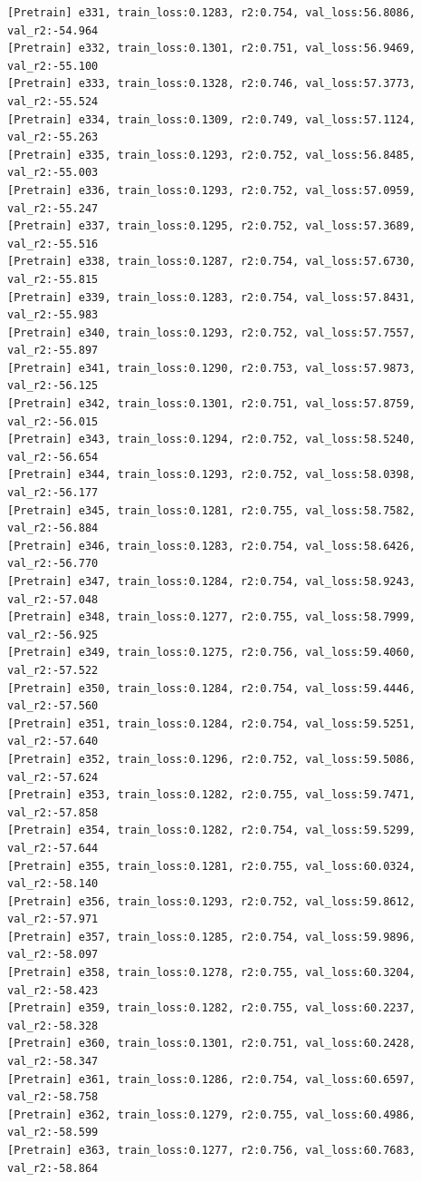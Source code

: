 \documentclass[a4paper, 12pt]{article}
\begin{document}
\begin{lstlisting}
[Pretrain] e331, train_loss:0.1283, r2:0.754, val_loss:56.8086, val_r2:-54.964
[Pretrain] e332, train_loss:0.1301, r2:0.751, val_loss:56.9469, val_r2:-55.100
[Pretrain] e333, train_loss:0.1328, r2:0.746, val_loss:57.3773, val_r2:-55.524
[Pretrain] e334, train_loss:0.1309, r2:0.749, val_loss:57.1124, val_r2:-55.263
[Pretrain] e335, train_loss:0.1293, r2:0.752, val_loss:56.8485, val_r2:-55.003
[Pretrain] e336, train_loss:0.1293, r2:0.752, val_loss:57.0959, val_r2:-55.247
[Pretrain] e337, train_loss:0.1295, r2:0.752, val_loss:57.3689, val_r2:-55.516
[Pretrain] e338, train_loss:0.1287, r2:0.754, val_loss:57.6730, val_r2:-55.815
[Pretrain] e339, train_loss:0.1283, r2:0.754, val_loss:57.8431, val_r2:-55.983
[Pretrain] e340, train_loss:0.1293, r2:0.752, val_loss:57.7557, val_r2:-55.897
[Pretrain] e341, train_loss:0.1290, r2:0.753, val_loss:57.9873, val_r2:-56.125
[Pretrain] e342, train_loss:0.1301, r2:0.751, val_loss:57.8759, val_r2:-56.015
[Pretrain] e343, train_loss:0.1294, r2:0.752, val_loss:58.5240, val_r2:-56.654
[Pretrain] e344, train_loss:0.1293, r2:0.752, val_loss:58.0398, val_r2:-56.177
[Pretrain] e345, train_loss:0.1281, r2:0.755, val_loss:58.7582, val_r2:-56.884
[Pretrain] e346, train_loss:0.1283, r2:0.754, val_loss:58.6426, val_r2:-56.770
[Pretrain] e347, train_loss:0.1284, r2:0.754, val_loss:58.9243, val_r2:-57.048
[Pretrain] e348, train_loss:0.1277, r2:0.755, val_loss:58.7999, val_r2:-56.925
[Pretrain] e349, train_loss:0.1275, r2:0.756, val_loss:59.4060, val_r2:-57.522
[Pretrain] e350, train_loss:0.1284, r2:0.754, val_loss:59.4446, val_r2:-57.560
[Pretrain] e351, train_loss:0.1284, r2:0.754, val_loss:59.5251, val_r2:-57.640
[Pretrain] e352, train_loss:0.1296, r2:0.752, val_loss:59.5086, val_r2:-57.624
[Pretrain] e353, train_loss:0.1282, r2:0.755, val_loss:59.7471, val_r2:-57.858
[Pretrain] e354, train_loss:0.1282, r2:0.754, val_loss:59.5299, val_r2:-57.644
[Pretrain] e355, train_loss:0.1281, r2:0.755, val_loss:60.0324, val_r2:-58.140
[Pretrain] e356, train_loss:0.1293, r2:0.752, val_loss:59.8612, val_r2:-57.971
[Pretrain] e357, train_loss:0.1285, r2:0.754, val_loss:59.9896, val_r2:-58.097
[Pretrain] e358, train_loss:0.1278, r2:0.755, val_loss:60.3204, val_r2:-58.423
[Pretrain] e359, train_loss:0.1282, r2:0.755, val_loss:60.2237, val_r2:-58.328
[Pretrain] e360, train_loss:0.1301, r2:0.751, val_loss:60.2428, val_r2:-58.347
[Pretrain] e361, train_loss:0.1286, r2:0.754, val_loss:60.6597, val_r2:-58.758
[Pretrain] e362, train_loss:0.1279, r2:0.755, val_loss:60.4986, val_r2:-58.599
[Pretrain] e363, train_loss:0.1277, r2:0.756, val_loss:60.7683, val_r2:-58.864

\end{lstlisting}
\end{document}

